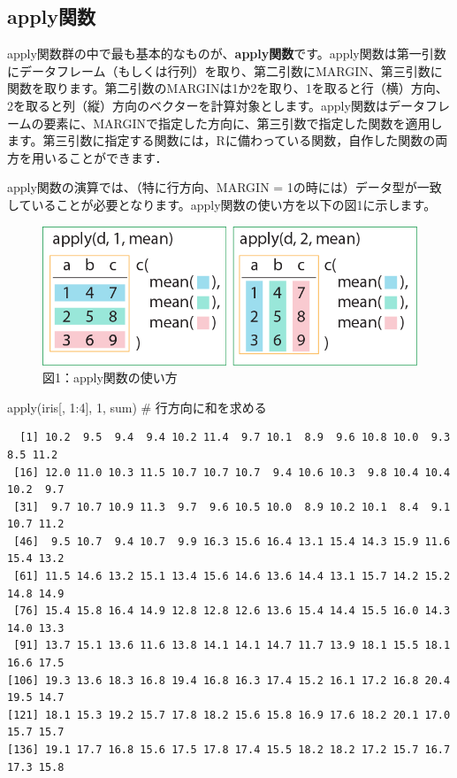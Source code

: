 \documentclass[
  letterpaper,
  DIV=11,
  numbers=noendperiod]{scrreprt}
\newenvironment{Shaded}{\begin{snugshade}}{\end{snugshade}}
\newcommand{\CommentTok}[1]{\textcolor[rgb]{0.37,0.37,0.37}{#1}}
\newcommand{\DecValTok}[1]{\textcolor[rgb]{0.68,0.00,0.00}{#1}}
\newcommand{\FunctionTok}[1]{\textcolor[rgb]{0.28,0.35,0.67}{#1}}
\newcommand{\NormalTok}[1]{\textcolor[rgb]{0.00,0.23,0.31}{#1}}
\newcommand{\SpecialCharTok}[1]{\textcolor[rgb]{0.37,0.37,0.37}{#1}}
\begin{document}
\hypertarget{applyux95a2ux6570}{%
\subsection{apply関数}\label{applyux95a2ux6570}}

apply関数群の中で最も基本的なものが、\textbf{apply関数}です。apply関数は第一引数にデータフレーム（もしくは行列）を取り、第二引数にMARGIN、第三引数に関数を取ります。第二引数のMARGINは1か2を取り、1を取ると行（横）方向、2を取ると列（縦）方向のベクターを計算対象とします。apply関数はデータフレームの要素に、MARGINで指定した方向に、第三引数で指定した関数を適用します。第三引数に指定する関数には，Rに備わっている関数，自作した関数の両方を用いることができます．

apply関数の演算では、（特に行方向、MARGIN =
1の時には）データ型が一致していることが必要となります。apply関数の使い方を以下の図1に示します。

\begin{figure}

{\centering \includegraphics{././image/chapter15_apply.png}

}

\caption{図1：apply関数の使い方}

\end{figure}

\begin{Shaded}
\begin{Highlighting}[]
\FunctionTok{apply}\NormalTok{(iris[, }\DecValTok{1}\SpecialCharTok{:}\DecValTok{4}\NormalTok{], }\DecValTok{1}\NormalTok{, sum) }\CommentTok{\# 行方向に和を求める}
\end{Highlighting}
\end{Shaded}

\begin{verbatim}
  [1] 10.2  9.5  9.4  9.4 10.2 11.4  9.7 10.1  8.9  9.6 10.8 10.0  9.3  8.5 11.2
 [16] 12.0 11.0 10.3 11.5 10.7 10.7 10.7  9.4 10.6 10.3  9.8 10.4 10.4 10.2  9.7
 [31]  9.7 10.7 10.9 11.3  9.7  9.6 10.5 10.0  8.9 10.2 10.1  8.4  9.1 10.7 11.2
 [46]  9.5 10.7  9.4 10.7  9.9 16.3 15.6 16.4 13.1 15.4 14.3 15.9 11.6 15.4 13.2
 [61] 11.5 14.6 13.2 15.1 13.4 15.6 14.6 13.6 14.4 13.1 15.7 14.2 15.2 14.8 14.9
 [76] 15.4 15.8 16.4 14.9 12.8 12.8 12.6 13.6 15.4 14.4 15.5 16.0 14.3 14.0 13.3
 [91] 13.7 15.1 13.6 11.6 13.8 14.1 14.1 14.7 11.7 13.9 18.1 15.5 18.1 16.6 17.5
[106] 19.3 13.6 18.3 16.8 19.4 16.8 16.3 17.4 15.2 16.1 17.2 16.8 20.4 19.5 14.7
[121] 18.1 15.3 19.2 15.7 17.8 18.2 15.6 15.8 16.9 17.6 18.2 20.1 17.0 15.7 15.7
[136] 19.1 17.7 16.8 15.6 17.5 17.8 17.4 15.5 18.2 18.2 17.2 15.7 16.7 17.3 15.8
\end{verbatim}
\end{document}
